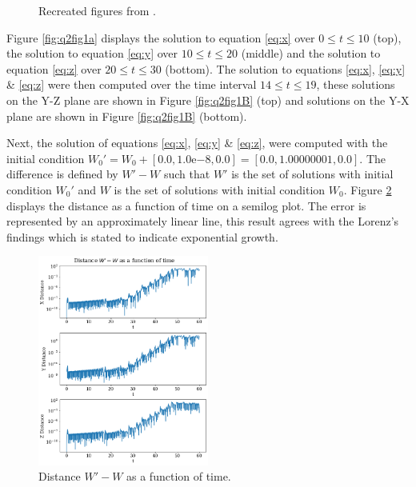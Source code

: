 \documentclass[10pt, preprint]{aastex}
\begin{document}
\begin{figure}[H]
  \centering
  \hfill
    \hfill
  \caption{Recreated figures from \cite{Lorenz}. \label{fig:q2}}
\end{figure}
Figure \ref{fig:q2fig1a} displays the solution to equation \ref{eq:x} over $0\le t \le10$ (top), the solution to equation \ref{eq:y} over $10\le t \le 20$ (middle) and the solution to equation \ref{eq:z} over $20\le t \le30$ (bottom). The solution to equations \ref{eq:x}, \ref{eq:y} \& \ref{eq:z} were then computed over the time interval $14\le t \le 19$, these solutions on the Y-Z plane are shown in Figure \ref{fig:q2fig1B} (top) and solutions on the Y-X plane are shown in Figure \ref{fig:q2fig1B} (bottom). 

Next, the solution of equations \ref{eq:x}, \ref{eq:y} \& \ref{eq:z}, were computed with the initial condition $W_0' = W_0 + [0.0, 1.0\mathrm{e}{-8}, 0.0] = [0.0, 1.00000001, 0.0]$. The difference is defined by $W'-W$ such that $W'$ is the set of solutions with initial condition $W_0'$ and $W$ is the set of solutions with initial condition $W_0$. Figure \ref{fig:err_plts} displays the distance as a function of time on a semilog plot. The error is represented by an approximately linear line, this result agrees with the Lorenz's findings which is stated to indicate exponential growth.

\begin{figure}[H]
    \centering
    \includegraphics[width = 0.5\textwidth]{q2fig3.png}
    \caption{Distance $W'-W$ as a function of time.}
    \label{fig:err_plts}
\end{figure}


\end{document}
